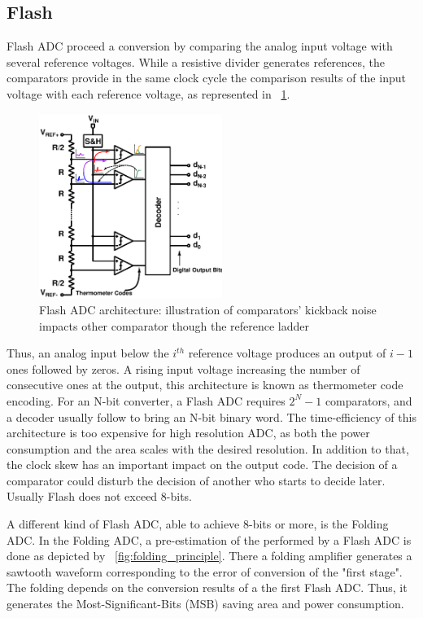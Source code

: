 \subsection{Flash}                             %
\label{sec:flash-adc}
Flash ADC proceed a conversion by comparing the analog input voltage with several reference voltages. While a resistive divider generates references, the comparators provide in the same clock cycle the comparison results of the input voltage with each reference voltage, as represented in \figurename~\ref{fig:flash_kickback}. 

\begin{figure}[htp]
	\centering
	\includegraphics[height=6cm]{Chapter3/Figs/flash_adc.ps}
	\caption{Flash ADC architecture: illustration of comparators' kickback noise impacts other comparator though the reference ladder}
	\label{fig:flash_kickback}
\end{figure}

Thus, an analog input below the \(i^{th} \) reference voltage produces an output of \(i-1 \) ones followed by zeros. A rising input voltage increasing the number of consecutive ones at the output, this architecture is known as thermometer code encoding. For an N-bit converter, a Flash ADC requires \(2^N-1\) comparators, and a decoder usually follow to bring an N-bit binary word. The time-efficiency of this architecture is too expensive for high resolution ADC, as both the power consumption and the area scales with the desired resolution. In addition to that, the clock skew has an important impact on the output code. The decision of a comparator could disturb the decision of another who starts to decide later. Usually Flash does not exceed 8-bits.

A different kind of Flash ADC, able to achieve 8-bits or more, is the Folding ADC. In the Folding ADC, a pre-estimation of the performed by a Flash ADC is done as depicted by \figurename~\ref{fig:folding_principle}. There a folding amplifier generates a sawtooth waveform corresponding to the error of conversion of the "first stage". The folding depends on the conversion results of a the first Flash ADC. Thus, it generates the Most-Significant-Bits (MSB) saving area and power consumption.

